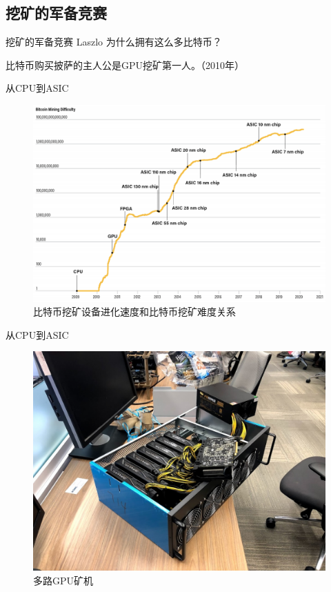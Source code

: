 \documentclass[11pt]{beamer}
\begin{document}
\subsection{挖矿的军备竞赛}
\begin{frame}{挖矿的军备竞赛}
	Laszlo 为什么拥有这么多比特币？

	比特币购买披萨的主人公是GPU挖矿第一人。（2010年）
\end{frame}

\begin{frame}{从CPU到ASIC}
	\begin{figure}
		\centering
		\includegraphics[width=0.8\linewidth]{figures/deviceRevolutionWithPrice}
		\caption{比特币挖矿设备进化速度和比特币挖矿难度关系}
		\label{fig:devicerevolutionwithprice}
	\end{figure}
\end{frame}

\begin{frame}{从CPU到ASIC}
	\begin{figure}
		\centering
		\includegraphics[width=0.7\linewidth]{figures/GPUMining}
		\caption{多路GPU矿机}
	\end{figure}
\end{frame}
\end{document}
